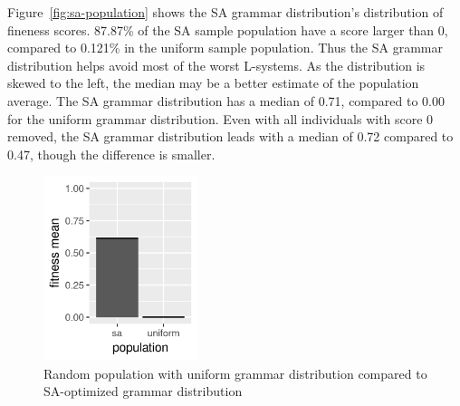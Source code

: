 Figure~\ref{fig:sa-population} shows the SA grammar distribution's distribution of fineness scores.
87.87\% of the SA sample population have a score larger than 0, compared to 0.121\% in the uniform sample population.
Thus the SA grammar distribution helps avoid most of the worst L-systems.
As the distribution is skewed to the left, the median may be a better estimate of the population average.
The SA grammar distribution has a median of 0.71, compared to 0.00 for the uniform grammar distribution.
Even with all individuals with score 0 removed, the SA grammar distribution leads with a median of 0.72 compared to 0.47, though the difference is smaller.

\begin{figure}
    \centering
    \includegraphics[width=0.4\textwidth]{figures/sa-uniform}
    \caption{Random population with uniform grammar distribution compared to SA-optimized grammar distribution}
    \label{fig:sa-uniform}
\end{figure}

